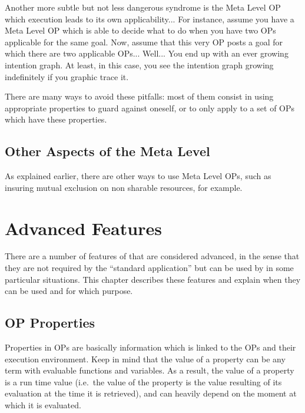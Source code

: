 Another more subtle but not less dangerous syndrome is the Meta Level OP which
execution leads to its own applicability... For instance, assume you have a
Meta Level OP which is able to decide what to do when you have two OPs
applicable for the same goal. Now, assume that this very OP posts a goal for
which there are two applicable OPs... Well... You end up with an ever growing
intention graph. At least, in this case, you see the intention graph growing
indefinitely if you graphic trace it.

There are many ways to avoid these pitfalls: most of them consist in
using appropriate properties to guard against oneself, or to only apply to
a set of OPs which have these properties.

\section{Other Aspects of the Meta Level}

As explained earlier, there are other ways to use Meta Level OPs, such as
insuring mutual exclusion on non sharable resources, for example.

\chapter{Advanced Features}

There are a number of features of \COPRS{} that are considered advanced, in the
sense that they are not required by the ``standard application'' but can be
used by in some particular situations. This chapter describes these features and
explain when they can be used and for which purpose.



\section{OP Properties}

Properties in OPs are basically information which is linked to the OPs and
their execution environment. Keep in mind that the value of a property can be
any term with evaluable functions and variables. As a result, the value of a
property is a run time value (i.e.\ the value of the property is the value
resulting of its evaluation at the time it is retrieved), and can heavily depend
on the moment at which it is evaluated.

